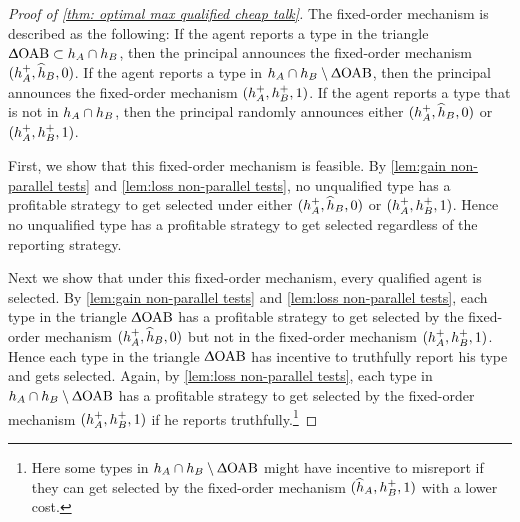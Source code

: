 \begin{proof}[Proof of \cref{thm: optimal max qualified cheap talk}]
The fixed-order mechanism is described as the following: 
If the agent reports a type in the triangle $\Updelta \text{OAB}\subset h_A\cap h_B$, then the principal announces the fixed-order mechanism $(h_A^+,\widehat{h}_B,0)$.
 If the agent reports a type in $ h_A\cap h_B\setminus \Updelta \text{OAB}$, then the principal announces the fixed-order mechanism $(h_A^+,h_B^+,1)$. 
 If the agent reports a type that is not in $ h_A\cap h_B$, then the principal randomly announces either $(h_A^+,\widehat{h}_B,0)$ or $(h_A^+,h_B^+,1)$.

First, we show that this fixed-order mechanism is feasible. 
By \cref{lem:gain non-parallel tests} and \cref{lem:loss non-parallel tests}, no unqualified type has a profitable strategy to get selected under either $(h_A^+,\widehat{h}_B,0)$ or $(h_A^+,h_B^+,1)$.
Hence no unqualified type has a profitable strategy to get selected regardless of the reporting strategy.

Next we show that under this fixed-order mechanism, every qualified agent is selected.
By \cref{lem:gain non-parallel tests} and \cref{lem:loss non-parallel tests}, each type in the triangle $\Updelta \text{OAB}$ has a profitable strategy to get selected by the fixed-order mechanism $(h_A^+,\widehat{h}_B,0)$ but not in the fixed-order mechanism $(h_A^+,h_B^+,1)$.
Hence each type in the triangle $\Updelta \text{OAB}$ has incentive to truthfully report his type and gets selected. Again, by \cref{lem:loss non-parallel tests}, each type in $h_A\cap h_B\setminus \Updelta\text{OAB}$ has a profitable strategy to get selected by the fixed-order mechanism $(h_A^+,h_B^+,1)$ if he reports truthfully.\footnote{Here some types in $h_A\cap h_B\setminus \Updelta\text{OAB}$ might have incentive to misreport if they can get selected by the fixed-order mechanism $(\widehat{h}_A,h_B^+,1)$ with a lower cost. }
\end{proof}